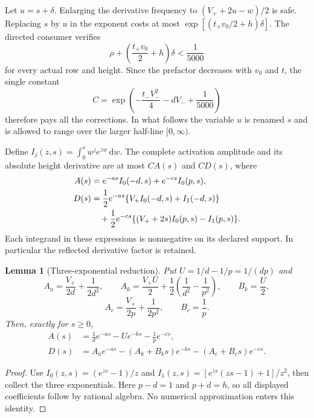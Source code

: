 \documentclass[11pt,a4paper]{article}
\newtheorem{lemma}[theorem]{Lemma}
\theoremstyle{definition}
\theoremstyle{remark}
\newcommand{\dd}{\mathrm d}
\begin{document}
Let $u=s+\delta$. Enlarging the derivative frequency to
$(V_++2u-w)/2$ is safe. Replacing $s$ by $u$ in the exponent costs at
most $\exp[(t_+v_0/2+h)\delta]$. The directed consumer verifies
\begin{equation}\label{eq:reserve}
 \rho+\left(\frac{t_+v_0}{2}+h\right)\delta<\frac1{5000}
\end{equation}
for every actual row and height. Since the prefactor decreases with
$v_0$ and $t$, the single constant
\begin{equation}\label{eq:C}
 C=\exp\left(-\frac{t_-V_-^2}{4}-dV_-+\frac1{5000}\right)
\end{equation}
therefore pays all the corrections. In what follows the variable $u$
is renamed $s$ and is allowed to range over the larger half-line
$[0,\infty)$.

Define $I_j(z,s)=\int_0^s w^j e^{zw}\,\dd w$. The complete activation
amplitude and its absolute height derivative are at most $C A(s)$ and
$C D(s)$, where
\begin{align}
 A(s)&=e^{-as}I_0(-d,s)+e^{-cs}I_0(p,s),\label{eq:Aintegral}\\
 D(s)&=\frac12e^{-as}\{V_+I_0(-d,s)+I_1(-d,s)\}\notag\\
 &\quad+\frac12e^{-cs}\{(V_++2s)I_0(p,s)-I_1(p,s)\}.
 \label{eq:Dintegral}
\end{align}
Each integrand in these expressions is nonnegative on its declared
support. In particular the reflected derivative factor is retained.

\begin{lemma}[Three-exponential reduction]\label{lem:three}
Put $U=1/d-1/p=1/(dp)$ and
\[
 A_a=\frac{V_+}{2d}+\frac1{2d^2},\qquad
 A_k=\frac{V_+U}{2}+\frac12\left(\frac1{d^2}-\frac1{p^2}\right),
 \qquad B_k=\frac U2,
\]
\[
 A_c=\frac{V_+}{2p}+\frac1{2p^2},\qquad B_c=\frac1p.
\]
Then, exactly for $s\ge0$,
\begin{align}
 A(s)&=\frac1d e^{-as}-Ue^{-ks}-\frac1p e^{-cs},\label{eq:Aclosed}\\
 D(s)&=A_a e^{-as}-(A_k+B_k s)e^{-ks}
                         -(A_c+B_c s)e^{-cs}.
 \label{eq:Dclosed}
\end{align}
\end{lemma}
\begin{proof}
Use $I_0(z,s)=(e^{zs}-1)/z$ and
$I_1(z,s)=[e^{zs}(zs-1)+1]/z^2$, then collect the three exponentials.
Here $p-d=1$ and $p+d=h$, so all displayed coefficients follow by
rational algebra. No numerical approximation enters this identity.
\end{proof}
\end{document}
